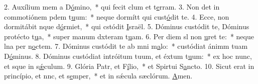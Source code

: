 2. Auxílium mem a D\uline{ó}mino,~* qui fecit clum et t\uline{e}rram.
3. Non det in commotiónem pdem t\uline{u}um:~* neque dormítt qui cust\uline{ó}dit te.
4. Ecce, non dormitábit nque d\uline{ó}rmiet,~* qui cstódit \uline{I}sraël.
5. Dóminus custódit te, Dóminus protécto t\uline{u}a,~* super manum dxteram t\uline{u}am.
6. Per diem sl non \uline{u}ret te:~* neque lna per n\uline{o}ctem.
7. Dóminus custódit te ab mni m\uline{a}lo:~* custódiat ánimm tuam D\uline{ó}minus.
8. Dóminus custódiat intróitum tuum, et éxtum t\uline{u}um:~* ex hoc nunc, et sque in s\uline{ǽ}culum.
9. Glória Patr, et F\uline{í}lio,~* et Spirtui S\uline{a}ncto.
10. Sicut erat in princípio, et nnc, et s\uline{e}mper,~* et in sǽcula sæclórum. \uline{A}men.
